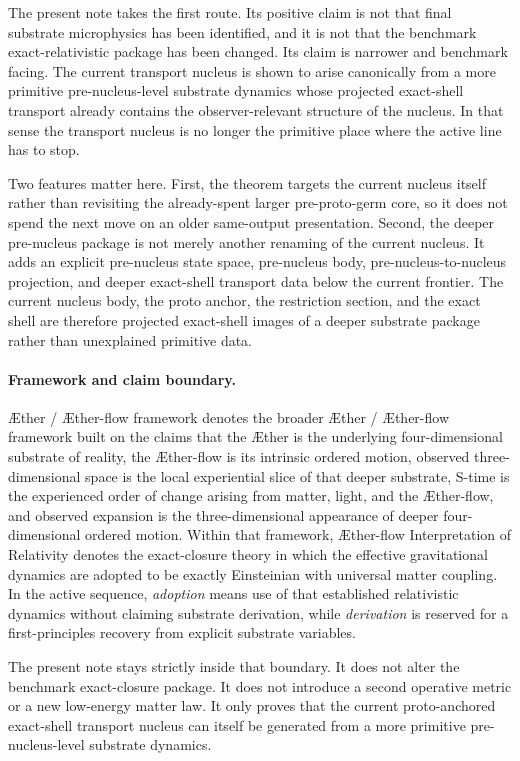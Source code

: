 \documentclass[11pt]{article}
\newcommand{\Aether}{\AE{}ther}
\newcommand{\Aflow}{\AE{}ther-flow}
\newcommand{\TheoryName}{\Aflow{} Interpretation of Relativity}
\newcommand{\TheoryProgram}{\Aether{} / \Aflow{} framework}
\begin{document}
The present note takes the first route. Its positive claim is not that final substrate microphysics has been identified, and it is not that the benchmark exact-relativistic package has been changed. Its claim is narrower and benchmark facing. The current transport nucleus is shown to arise canonically from a more primitive pre-nucleus-level substrate dynamics whose projected exact-shell transport already contains the observer-relevant structure of the nucleus. In that sense the transport nucleus is no longer the primitive place where the active line has to stop.

Two features matter here. First, the theorem targets the current nucleus itself rather than revisiting the already-spent larger pre-proto-germ core, so it does not spend the next move on an older same-output presentation. Second, the deeper pre-nucleus package is not merely another renaming of the current nucleus. It adds an explicit pre-nucleus state space, pre-nucleus body, pre-nucleus-to-nucleus projection, and deeper exact-shell transport data below the current frontier. The current nucleus body, the proto anchor, the restriction section, and the exact shell are therefore projected exact-shell images of a deeper substrate package rather than unexplained primitive data.

\paragraph{Framework and claim boundary.}
\TheoryProgram{} denotes the broader \Aether{} / \Aflow{} framework built on the claims that the \Aether{} is the underlying four-dimensional substrate of reality, the \Aflow{} is its intrinsic ordered motion, observed three-dimensional space is the local experiential slice of that deeper substrate, S-time is the experienced order of change arising from matter, light, and the \Aflow{}, and observed expansion is the three-dimensional appearance of deeper four-dimensional ordered motion. Within that framework, \TheoryName{} denotes the exact-closure theory in which the effective gravitational dynamics are adopted to be exactly Einsteinian with universal matter coupling. In the active sequence, \emph{adoption} means use of that established relativistic dynamics without claiming substrate derivation, while \emph{derivation} is reserved for a first-principles recovery from explicit substrate variables.

The present note stays strictly inside that boundary. It does not alter the benchmark exact-closure package. It does not introduce a second operative metric or a new low-energy matter law. It only proves that the current proto-anchored exact-shell transport nucleus can itself be generated from a more primitive pre-nucleus-level substrate dynamics.
\end{document}
